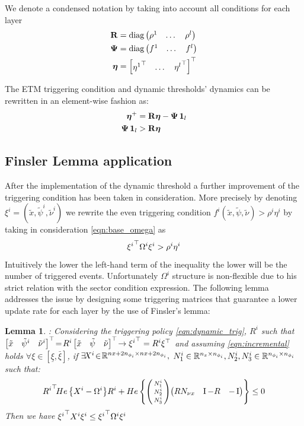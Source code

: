 \documentclass{ifacconf}
\theoremstyle{plain}
\newtheorem{lemma}{Lemma}
\begin{document}
We denote a condensed notation by taking into account all conditions for each layer
\begin{equation}
\begin{aligned}
   {\bf{R}} &= \text{diag} \left(\begin{matrix}\rho^1 & \dots & \rho^l \end{matrix}\right)\\
   \mathbf{\Psi} &= \text{diag} \left(\begin{matrix} f^1 & \dots & f^l \end{matrix}\right)\\ 
   \boldsymbol{\eta} &= \left[\begin{matrix} {\eta^1}^\top & \dots & {\eta^l}^\top \end{matrix}\right]^\top   
\end{aligned}
\end{equation}

The ETM triggering condition and dynamic thresholds' dynamics can be rewritten in an element-wise fashion as:
\begin{equation}
\begin{aligned}
    \boldsymbol{\eta}^+ &= {\bf{R}} \boldsymbol{\eta} - \mathbf{\Psi} \operatorname{\mathbf{1}}_l\\
    \mathbf{\Psi} \operatorname{\mathbf{1}}_l &> {\bf{R}} \boldsymbol{\eta}
\end{aligned}
\end{equation}

\subsection{Finsler Lemma application}
After the implementation of the dynamic threshold a further improvement of the triggering condition has been taken in consideration. More precisely by denoting $\xi^i = (\tilde{x}, \tilde{\psi}^i, \tilde{\nu}^i)$ we rewrite the even triggering condition $f^i(\tilde{x}, \tilde{\psi}, \tilde{\nu}) > \rho^i \eta^i$ by taking in consideration \eqref{eqn:base_omega} as 
\begin{equation}
    {\xi^i}^\top \Omega^i \xi^i > \rho^i \eta^i
\end{equation}
Intuitively the lower the left-hand term of the inequality the lower will be the number of triggered events. Unfortunately $\Omega^i$ structure is non-flexible due to his strict relation with the sector condition expression. The following lemma addresses the issue by designing some triggering matrices that guarantee a lower update rate for each layer by the use of Finsler's lemma:

\begin{lemma}: \emph{Considering the triggering policy \eqref{eqn:dynamic_trig}, $R^i$ such that $\left[\begin{matrix}\tilde{x} & \tilde{\psi}^i & \tilde{\nu}^i\end{matrix}\right]^\top\! = \!R^i \left[\begin{matrix}\tilde{x} & \tilde{\psi} & \tilde{\nu}\end{matrix}\right]^\top\! \to {\xi^i}^\top = R^i \xi^\top$ and assuming \eqref{eqn:incremental} holds $\forall \xi \in \left[ \underline{\xi}, \bar{\xi}\right]$, if $\exists \! X^i\! \in\! {\mathbb{R}}^{nx + 2n_{\phi_i} \times nx + 2n_{\phi_i}}, $ $N^i_1 \in {\mathbb{R}}^{n_x \times n_{\phi_i}}, N^i_2, N^i_3 \in {\mathbb{R}}^{n_{\phi_i} \times n_{\phi_i}}$ such that:
\begin{equation}\label{eqn:finsler}
     {R^i}^\top\! He\left\{X^i - \Omega^i\right\}\! R^i + He\left\{ \left(\begin{smallmatrix} N^i_1\\ N^i_2\\ N^i_3 \end{smallmatrix} \right)\! \left(\begin{matrix}R N_{\nu x} & \operatorname{I} - R & -\operatorname{I}\end{matrix}\right)\right\} \leq 0
\end{equation}
Then we have ${\xi^i}^\top X^i \xi^i \leq {\xi^i}^\top \Omega^i \xi^i$}
\end{lemma}
\end{document}
